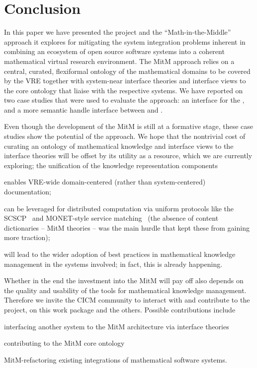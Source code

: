 \section{Conclusion}\label{sec:concl}
In this paper we have presented the \ODK project and the ``Math-in-the-Middle'' approach
it explores for mitigating the system integration problems inherent in combining an ecosystem
of open source software systems into a coherent mathematical virtual research environment.
The MitM approach relies on a central, curated, flexiformal ontology of the mathematical
domains to be covered by the VRE together with system-near interface theories and
interface views to the core ontology that liaise with the respective systems. We have reported
on two case studies that were used to evaluate the approach: an interface for the \LMFDB,
and a more semantic handle interface between \GAP and \Sage.

Even though the development of the MitM is still at a formative stage, these case studies
show the potential of the approach. We hope that the nontrivial cost of curating an
ontology of mathematical knowledge and interface views to the interface theories will be offset
by its utility as a resource, which we are currently exploring; the unification of the
knowledge representation components
\begin{compactenum}
\item enables VRE-wide domain-centered (rather than system-centered) documentation;
\item can be leveraged for distributed computation via uniform protocols like the
  SCSCP~\cite{HorRoz:ossp09} and MONET-style service
  matching~\cite{CaprottiEtAl:MathServiceMatching04:tr} (the absence of content
  dictionaries -- MitM theories -- was the main hurdle that kept these from gaining more
  traction);
\item will lead to the wider adoption of best practices in
  mathematical knowledge management in the systems involved; in
  fact, this is already happening.
\end{compactenum}
Whether in the end the investment into the MitM will pay off also depends on the quality
and usability of the tools for mathematical knowledge management. Therefore we invite the
CICM community to interact with and contribute to the \ODK project, on this work package
and the others. Possible contributions include
\begin{compactenum}
\item interfacing another system to the MitM architecture via interface theories
\item contributing to the MitM core ontology 
\item MitM-refactoring existing integrations of mathematical software systems.
\end{compactenum}

